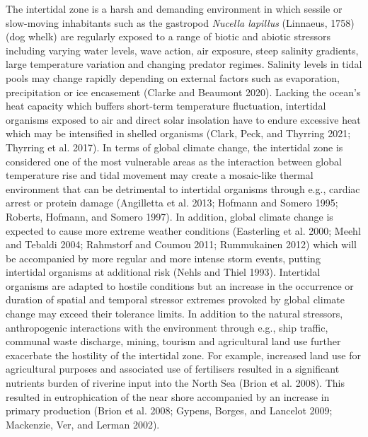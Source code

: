 \documentclass[smallextended]{svjour3}       %
\begin{document}
The intertidal zone is a harsh and demanding environment in which
sessile or slow-moving inhabitants such as the gastropod \emph{Nucella
lapillus} (Linnaeus, 1758) (dog whelk) are regularly exposed to a range
of biotic and abiotic stressors including varying water levels, wave
action, air exposure, steep salinity gradients, large temperature
variation and changing predator regimes. Salinity levels in tidal pools
may change rapidly depending on external factors such as evaporation,
precipitation or ice encasement (Clarke and Beaumont 2020). Lacking the
ocean's heat capacity which buffers short-term temperature fluctuation,
intertidal organisms exposed to air and direct solar insolation have to
endure excessive heat which may be intensified in shelled organisms
(Clark, Peck, and Thyrring 2021; Thyrring et al. 2017). In terms of
global climate change, the intertidal zone is considered one of the most
vulnerable areas as the interaction between global temperature rise and
tidal movement may create a mosaic-like thermal environment that can be
detrimental to intertidal organisms through e.g., cardiac arrest or
protein damage (Angilletta et al. 2013; Hofmann and Somero 1995;
Roberts, Hofmann, and Somero 1997). In addition, global climate change
is expected to cause more extreme weather conditions (Easterling et al.
2000; Meehl and Tebaldi 2004; Rahmstorf and Coumou 2011; Rummukainen
2012) which will be accompanied by more regular and more intense storm
events, putting intertidal organisms at additional risk (Nehls and Thiel
1993). Intertidal organisms are adapted to hostile conditions but an
increase in the occurrence or duration of spatial and temporal stressor
extremes provoked by global climate change may exceed their tolerance
limits. In addition to the natural stressors, anthropogenic interactions
with the environment through e.g., ship traffic, communal waste
discharge, mining, tourism and agricultural land use further exacerbate
the hostility of the intertidal zone. For example, increased land use
for agricultural purposes and associated use of fertilisers resulted in
a significant nutrients burden of riverine input into the North Sea
(Brion et al. 2008). This resulted in eutrophication of the near shore
accompanied by an increase in primary production (Brion et al. 2008;
Gypens, Borges, and Lancelot 2009; Mackenzie, Ver, and Lerman 2002).
\end{document}
